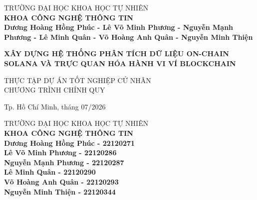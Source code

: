 \begin{titlepage}

\begin{center}
TRƯỜNG ĐẠI HỌC KHOA HỌC TỰ NHIÊN\\
\textbf{KHOA CÔNG NGHỆ THÔNG TIN}\\[2cm]


{ \Large \bfseries Dương Hoàng Hồng Phúc - Lê Võ Minh Phương - Nguyễn Mạnh Phương - Lê Minh Quân - Võ Hoàng Anh Quân - Nguyễn Minh Thiện\\[2cm] } 


{ \Large \bfseries XÂY DỰNG HỆ THỐNG PHÂN TÍCH DỮ
LIỆU ON-CHAIN SOLANA VÀ TRỰC QUAN
HÓA HÀNH VI VÍ BLOCKCHAIN \\[3cm]} 


\large THỰC TẬP DỰ ÁN TỐT NGHIỆP CỬ NHÂN\\
\large CHƯƠNG TRÌNH CHÍNH QUY\\



\vfill
Tp. Hồ Chí Minh, tháng 07/2026

\end{center}

\pagebreak



\begin{center}

TRƯỜNG ĐẠI HỌC KHOA HỌC TỰ NHIÊN\\
\textbf{KHOA CÔNG NGHỆ THÔNG TIN}\\[2cm]


{\large \bfseries Dương Hoàng Hồng Phúc - 22120271\\
            Lê Võ Minh Phương - 22120286\\
            Nguyễn Mạnh Phương - 22120287\\
            Lê Minh Quân - 22120290\\
            Võ Hoàng Anh Quân - 22120293\\
            Nguyễn Minh Thiện - 22120344\\} 



\end{center}
\end{titlepage}
